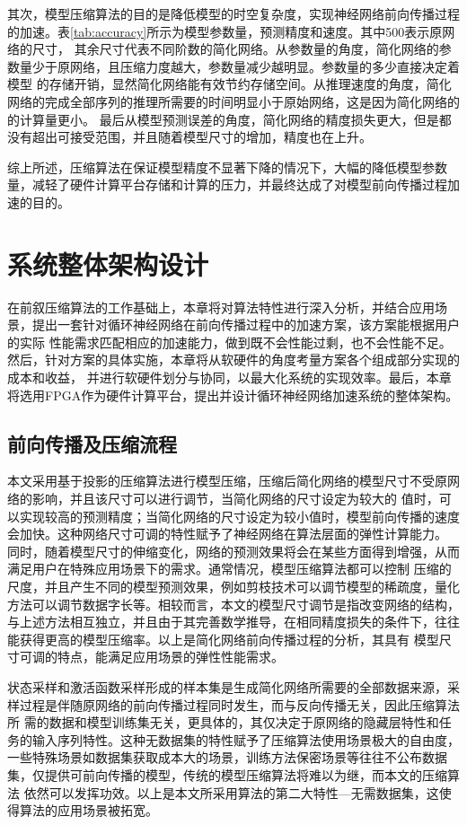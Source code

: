 其次，模型压缩算法的目的是降低模型的时空复杂度，实现神经网络前向传播过程的加速。表\ref{tab:accuracy}所示为模型参数量，预测精度和速度。其中500表示原网络的尺寸，
其余尺寸代表不同阶数的简化网络。从参数量的角度，简化网络的参数量少于原网络，且压缩力度越大，参数量减少越明显。参数量的多少直接决定着模型
的存储开销，显然简化网络能有效节约存储空间。从推理速度的角度，简化网络的完成全部序列的推理所需要的时间明显小于原始网络，这是因为简化网络的的计算量更小。
最后从模型预测误差的角度，简化网络的精度损失更大，但是都没有超出可接受范围，并且随着模型尺寸的增加，精度也在上升。

综上所述，压缩算法在保证模型精度不显著下降的情况下，大幅的降低模型参数量，减轻了硬件计算平台存储和计算的压力，并最终达成了对模型前向传播过程加速的目的。

\section{系统整体架构设计}
在前叙压缩算法的工作基础上，本章将对算法特性进行深入分析，并结合应用场景，提出一套针对循环神经网络在前向传播过程中的加速方案，该方案能根据用户的实际
性能需求匹配相应的加速能力，做到既不会性能过剩，也不会性能不足。然后，针对方案的具体实施，本章将从软硬件的角度考量方案各个组成部分实现的成本和收益，
并进行软硬件划分与协同，以最大化系统的实现效率。最后，本章将选用FPGA作为硬件计算平台，提出并设计循环神经网络加速系统的整体架构。
\subsection{前向传播及压缩流程}
本文采用基于投影的压缩算法进行模型压缩，压缩后简化网络的模型尺寸不受原网络的影响，并且该尺寸可以进行调节，当简化网络的尺寸设定为较大的
值时，可以实现较高的预测精度；当简化网络的尺寸设定为较小值时，模型前向传播的速度会加快。这种网络尺寸可调的特性赋予了神经网络在算法层面的弹性计算能力。
同时，随着模型尺寸的伸缩变化，网络的预测效果将会在某些方面得到增强，从而满足用户在特殊应用场景下的需求。通常情况，模型压缩算法都可以控制
压缩的尺度，并且产生不同的模型预测效果，例如剪枝技术可以调节模型的稀疏度，量化方法可以调节数据字长等。相较而言，本文的模型尺寸调节是指改变网络的结构，
与上述方法相互独立，并且由于其完善数学推导，在相同精度损失的条件下，往往能获得更高的模型压缩率。以上是简化网络前向传播过程的分析，其具有
模型尺寸可调的特点，能满足应用场景的弹性性能需求。

状态采样和激活函数采样形成的样本集是生成简化网络所需要的全部数据来源，采样过程是伴随原网络的前向传播过程同时发生，而与反向传播无关，因此压缩算法所
需的数据和模型训练集无关，更具体的，其仅决定于原网络的隐藏层特性和任务的输入序列特性。这种无数据集的特性赋予了压缩算法使用场景极大的自由度，
一些特殊场景如数据集获取成本大的场景，训练方法保密场景等往往不公布数据集，仅提供可前向传播的模型，传统的模型压缩算法将难以为继，而本文的压缩算法
依然可以发挥功效。以上是本文所采用算法的第二大特性---无需数据集，这使得算法的应用场景被拓宽。

